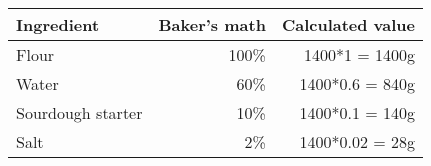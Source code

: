 


\begin{tabular}{lrr}
\toprule
\textbf{Ingredient} & \multicolumn{1}{l}{\textbf{Baker's math}} & \multicolumn{1}{l}{\textbf{Calculated value}} \\ \midrule
Flour               & 100\%                                      & 1400*1 = 1400g                               \\ \midrule
Water               & 60\%                                       & 1400*0.6 = 840g                              \\ \midrule
Sourdough starter   & 10\%                                       & 1400*0.1 = 140g                              \\ \midrule
Salt                & 2\%                                        & 1400*0.02 = 28g                              \\ \bottomrule
\end{tabular}

